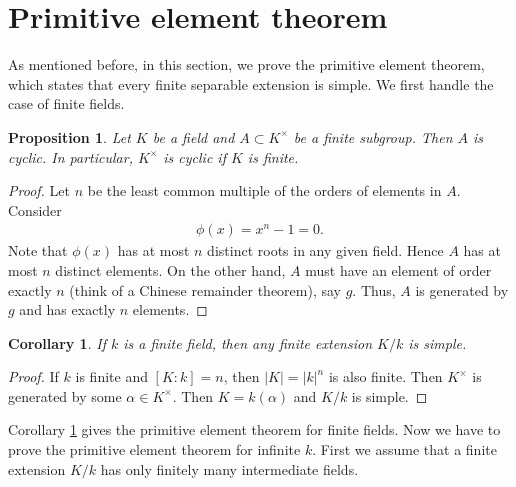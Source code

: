 \documentclass[12pt]{report}
\theoremstyle{plain}
\newtheorem{corollary}[theorem]{Corollary}
\newtheorem{proposition}[theorem]{Proposition}
\theoremstyle{remark}
\theoremstyle{definition}
\begin{document}
\clearpage
\section{Primitive element theorem}
As mentioned before, in this section, we prove the primitive element theorem, which states that every finite separable extension is simple. We first handle the case of finite fields.

\begin{proposition}
    Let $K$ be a field and $A\subset K^\times$ be a finite subgroup. Then $A$ is cyclic. In particular, $K^\times$ is cyclic if $K$ is finite.
\end{proposition}
\begin{proof}
    Let $n$ be the least common multiple of the orders of elements in $A$. Consider
    \begin{align*}
        \phi(x)=x^n-1=0.
    \end{align*}
    Note that $\phi(x)$ has at most $n$ distinct roots in any given field. Hence $A$ has at most $n$ distinct elements. On the other hand, $A$ must have an element of order exactly $n$ (think of a Chinese remainder theorem), say $g$. Thus, $A$ is generated by $g$ and has exactly $n$ elements.
\end{proof}

\begin{corollary}\label{Corollary 3.8.2.}
    If $k$ is a finite field, then any finite extension $K/k$ is simple.
\end{corollary}
\begin{proof}
    If $k$ is finite and $[K:k]=n$, then $|K|=|k|^n$ is also finite. Then $K^\times$ is generated by some $\alpha\in K^\times$. Then $K=k(\alpha)$ and $K/k$ is simple.
\end{proof}

Corollary \ref{Corollary 3.8.2.} gives the primitive element theorem for finite fields. Now we have to prove the primitive element theorem for infinite $k$. First we assume that a finite extension $K/k$ has only finitely many intermediate fields.
\end{document}
